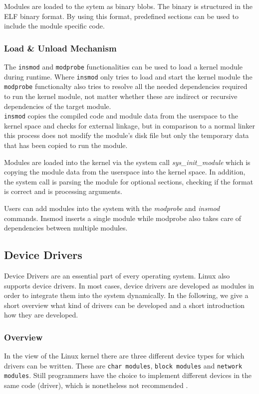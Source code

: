 \documentclass{sig-alternate-05-2015}
\begin{document}

Modules are loaded to the sytem as binary blobs. The binary is structured in the ELF binary format. By using this format, predefined sections can be used to include the module specific code. \\


\subsubsection{Load \& Unload Mechanism}
The \texttt{insmod} and \texttt{modprobe} functionalities can be used to load a kernel module during runtime. Where \texttt{insmod} only tries to load and start the kernel module the \texttt{modprobe} functionalty also tries to resolve all the needed dependencies required to run the kernel module, not matter whether these are indirect or recursive dependencies of the target module. \\
\texttt{insmod} copies the compiled code and module data from the userspace to the kernel space and checks for external linkage, but in comparison to a normal linker this process does not modify the module's disk file but only the temporary data that has been copied to run the module.

Modules are loaded into the kernel via the system call \emph{sys\_init\_module} which is copying the module data from the userspace into the kernel space. In addition, the system call is parsing the module for optional sections, checking if the format is correct and is processing arguments. 

Users can add modules into the system with the \emph{modprobe} and \emph{insmod} commands. Insmod inserts a single module while modprobe also takes care of dependencies between multiple modules.

\subsection{Device Drivers}
Device Drivers are an essential part of every operating system. Linux also supports device drivers. In most cases, device drivers are developed as modules in order to integrate them into the system dynamically. In the following, we give a short overview what kind of drivers can be developed and a short introduction how they are developed. 
\subsubsection{Overview}
In the view of the Linux kernel there are three different device types for which drivers can be written. These are \texttt{char modules}, \texttt{block modules} and \texttt{network modules}. Still programmers have the choice to implement different devices in the same code (driver), which is nonetheless not recommended \cite{Corbet:2005:LDD:1209083}.
\end{document}
